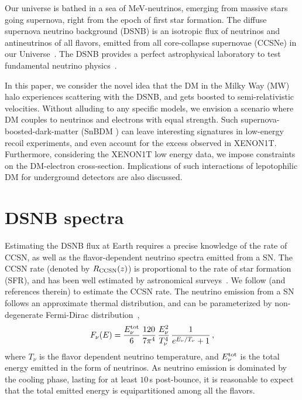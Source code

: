 \documentclass[prd,aps,twocolumn,tightenlines,notitlepage,nofootinbib,preprintnumbers,letterpaper,superscriptaddress]{revtex4-2}
\def \R  {R_{\rm CCSN}}
\newcommand{\sbdm}{SnBDM }
\begin{document}
Our universe is bathed in a sea of MeV-neutrinos, emerging from massive stars going supernova, right from the epoch of first star formation. The diffuse supernova neutrino background (DSNB) is an isotropic flux of neutrinos and antineutrinos of all flavors, emitted from all core-collapse supernovae (CCSNe) in our Universe~\cite{Beacom:2010kk,Lunardini:2010ab}. The DSNB provides a perfect astrophysical laboratory to test fundamental neutrino physics~\cite{deGouvea:2020eqq}. 

In this paper, we consider the novel idea that the DM in the Milky Way (MW) halo experiences scattering with the DSNB, and gets boosted to semi-relativistic velocities. Without alluding to any specific models, we envision a scenario where DM couples to neutrinos and electrons with equal strength. Such supernova-boosted-dark-matter (\sbdm) can leave interesting signatures in low-energy recoil experiments, and even account for the excess observed in XENON1T. Furthermore, considering the XENON1T low energy data, we impose constraints on the DM-electron cross-section. Implications of such interactions of lepotophilic DM for underground detectors are also discussed.
\section{DSNB spectra}
Estimating the DSNB flux at Earth requires a precise knowledge of the rate of CCSN, as well as the flavor-dependent neutrino spectra emitted from a SN. The CCSN rate (denoted by $ \R(z)$)  is proportional to the rate of star formation (SFR), and has been well estimated by astronomical surveys~\cite{Hopkins:2006bw}. We follow \cite{deGouvea:2020eqq} (and references therein) to estimate the CCSN rate. The neutrino emission from a SN follows an approximate thermal distribution, and can be parameterized by non-degenerate Fermi-Dirac distribution~\cite{Beacom:2010kk},
\begin{equation}\label{eq:Nuspec}
F_\nu(E)=\frac{E_\nu^{\rm tot}}{6}\,\frac{120}{7\pi^4}\,\frac{E_\nu^2}{T_\nu^4}\,\frac{1}{e^{E_\nu/T_\nu}+1}\,,
\end{equation}
where $T_\nu$ is the flavor dependent neutrino temperature, and $E_\nu^{\rm tot}$ is the total energy emitted in the form of neutrinos. As neutrino emission is dominated by the cooling phase, lasting for at least $10\,$s post-bounce, it is reasonable to expect that the total emitted energy is equipartitioned among all the flavors. 
\end{document}

